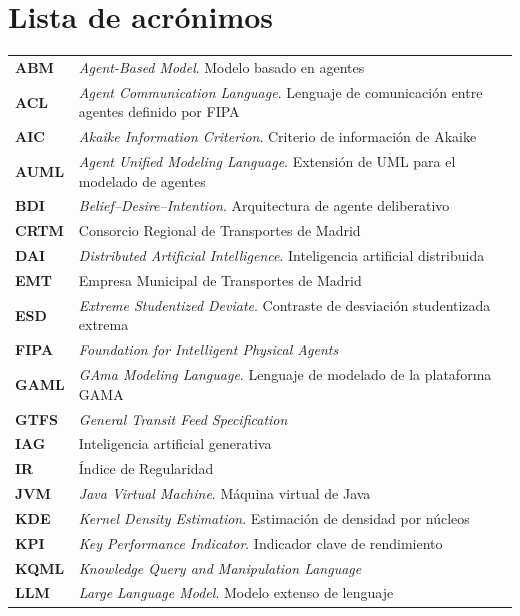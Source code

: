 \documentclass[12pt]{report} %
\begin{document}
\chapter*{Lista de acrónimos}
\thispagestyle{fancy}

\begin{longtable}{@{}p{2.5cm}p{\dimexpr\textwidth-3cm\relax}@{}}
\textbf{ABM}   & \textit{Agent-Based Model}. Modelo basado en agentes \\
\textbf{ACL}   & \textit{Agent Communication Language}. Lenguaje de comunicación entre agentes definido por FIPA \\
\textbf{AIC}   & \textit{Akaike Information Criterion}. Criterio de información de Akaike \\
\textbf{AUML}  & \textit{Agent Unified Modeling Language}. Extensión de UML para el modelado de agentes \\
\textbf{BDI}   & \textit{Belief--Desire--Intention}. Arquitectura de agente deliberativo \\
\textbf{CRTM}  & Consorcio Regional de Transportes de Madrid \\
\textbf{DAI}   & \textit{Distributed Artificial Intelligence}. Inteligencia artificial distribuida \\
\textbf{EMT}   & Empresa Municipal de Transportes de Madrid \\
\textbf{ESD}   & \textit{Extreme Studentized Deviate}. Contraste de desviación studentizada extrema \\
\textbf{FIPA}  & \textit{Foundation for Intelligent Physical Agents} \\
\textbf{GAML}  & \textit{GAma Modeling Language}. Lenguaje de modelado de la plataforma GAMA \\
\textbf{GTFS}  & \textit{General Transit Feed Specification} \\
\textbf{IAG}   & Inteligencia artificial generativa \\
\textbf{IR}    & Índice de Regularidad \\
\textbf{JVM}   & \textit{Java Virtual Machine}. Máquina virtual de Java \\
\textbf{KDE}   & \textit{Kernel Density Estimation}. Estimación de densidad por núcleos \\
\textbf{KPI}   & \textit{Key Performance Indicator}. Indicador clave de rendimiento \\
\textbf{KQML}  & \textit{Knowledge Query and Manipulation Language} \\
\textbf{LLM}   & \textit{Large Language Model}. Modelo extenso de lenguaje \\

\end{longtable}
\end{document}
